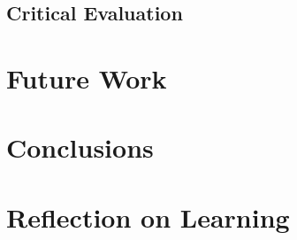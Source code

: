 \documentclass[12pt]{report}
\begin{document}
\subsection{Critical Evaluation}\label{Eval}


\section{Future Work}\label{FutureWork}


\section{Conclusions}\label{Conclusions}

\section{Reflection on Learning}\label{Reflection}
\end{document}
